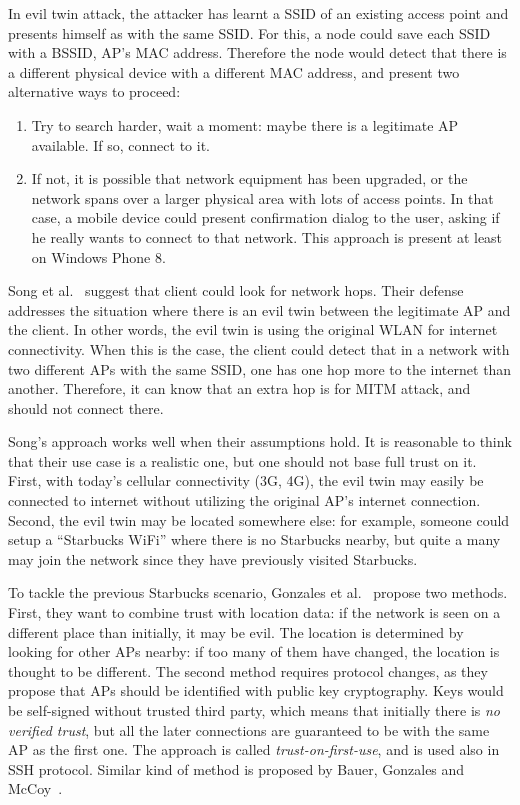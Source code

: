 \documentclass[12pt,a4paper,oneside,pdftex]{report}
\begin{document}
In evil twin attack, the attacker has learnt a SSID of an existing access point and presents himself as with the same SSID. For this, a node could save each SSID with a BSSID, AP's MAC address. Therefore the node would detect that there is a different physical device with a different MAC address, and present two alternative ways to proceed:
\begin{enumerate}
    \item Try to search harder, wait a moment: maybe there is a legitimate AP available. If so, connect to it.
    \item If not, it is possible that network equipment has been upgraded, or the network spans over a larger physical area with lots of access points. In that case, a mobile device could present confirmation dialog to the user, asking if he really wants to connect to that network. This approach is present at least on Windows Phone 8.
\end{enumerate}

Song et al.~\cite{song2010peeping} suggest that client could look for network hops. Their defense addresses the situation where there is an evil twin between the legitimate AP and the client. In other words, the evil twin is using the original WLAN for internet connectivity. When this is the case, the client could detect that in a network with two different APs with the same SSID, one has one hop more to the internet than another. Therefore, it can know that an extra hop is for MITM attack, and should not connect there.

Song's approach works well when their assumptions hold. It is reasonable to think that their use case is a realistic one, but one should not base full trust on it. First, with today's cellular connectivity (3G, 4G), the evil twin may easily be connected to internet without utilizing the original AP's internet connection. Second, the evil twin may be located somewhere else: for example, someone could setup a ``Starbucks WiFi'' where there is no Starbucks nearby, but quite a many may join the network since they have previously visited Starbucks.

To tackle the previous Starbucks scenario, Gonzales et al.~\cite{gonzales2010practical} propose two methods. First, they want to combine trust with location data: if the network is seen on a different place than initially, it may be evil. The location is determined by looking for other APs nearby: if too many of them have changed, the location is thought to be different. The second method requires protocol changes, as they propose that APs should be identified with public key cryptography. Keys would be self-signed without trusted third party, which means that initially there is \emph{no verified trust}, but all the later connections are guaranteed to be with the same AP as the first one. The approach is called \emph{trust-on-first-use}, and is used also in SSH protocol. Similar kind of method is proposed by Bauer, Gonzales and McCoy~\cite{bauer2008mitigating}.
\end{document}

